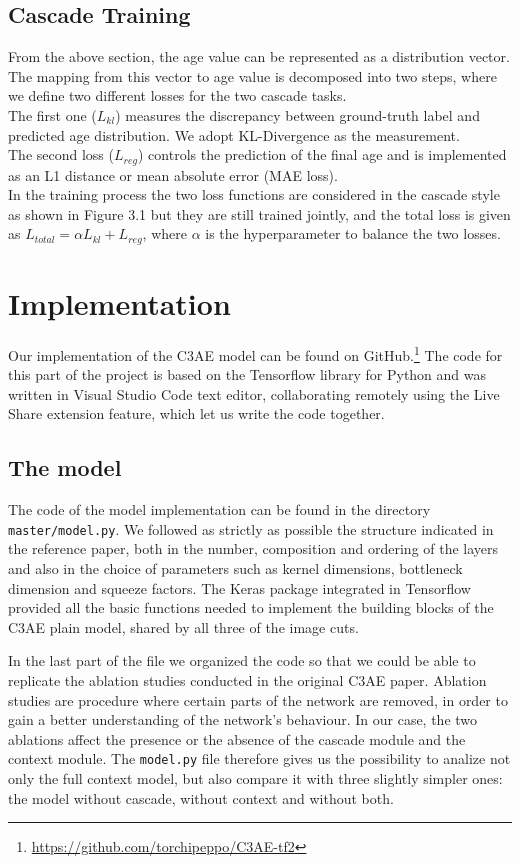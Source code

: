 \subsection*{Cascade Training}
From the above section, the age value can be represented as a distribution vector. The mapping from this 
vector to age value is decomposed into two steps, where we define two different losses for the two cascade 
tasks.\\
The first one ($L_{kl}$) measures the discrepancy between ground-truth label and predicted age distribution.
We adopt KL-Divergence as the measurement.\\
The second loss ($L_{reg}$) controls the prediction of the final age and is implemented as an L1 distance
or mean absolute error (MAE loss).\\
In the training process the two loss functions are considered in the cascade style as shown in Figure 3.1 
but they are still trained jointly, and the total loss is given as
$L_{total} = \alpha L_{kl} + L_{reg}$, where $\alpha$ is the hyperparameter to balance the two losses.

\section{Implementation}
Our implementation of the C3AE model can be found on
GitHub.\footnote{\url{https://github.com/torchipeppo/C3AE-tf2}}
The code for this part of the project is based on the Tensorflow library for Python and was written in 
Visual Studio Code text editor, collaborating remotely using the Live Share extension feature, which let 
us write the code together.
\subsection*{The model}
The code of the model implementation can be found in the directory \texttt{master/model.py}. We followed 
as strictly as possible the structure indicated in the reference paper, both in the number, composition 
and ordering of the layers and also in the choice of parameters such as kernel dimensions, bottleneck
dimension and squeeze factors.
The Keras package integrated in Tensorflow provided all the basic functions needed to implement the
building blocks of the C3AE plain model, shared by all three of the image cuts.


In the last part of the file we organized the code so that we could be able to replicate the ablation
studies conducted in the original C3AE paper. Ablation studies are procedure where certain parts of the 
network are removed, in order to gain a better understanding of the network’s behaviour. In our case, 
the two ablations affect the presence or the absence of the cascade module and the context module.
The \texttt{model.py} file therefore gives us the possibility to analize not only the full context 
model, but also compare it with three slightly simpler ones: the model without cascade, without context 
and without both.

